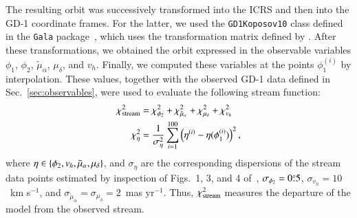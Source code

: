 \documentclass[referee]{aa} %
\begin{document}
The resulting orbit was successively transformed into the ICRS and then into the GD-1 coordinate frames. For the latter, we used the \texttt{GD1Koposov10} class defined in the \texttt{Gala} package~\citep{gala,adrian_price_whelan_2020_4159870}, which uses the transformation matrix defined by \citet{Koposov_2010}.
After these transformations, we obtained the orbit expressed in the observable variables $\phi_1$, $\phi_2$, $\tilde{\mu}_\alpha$, $\mu_\delta$, and $v_h$. Finally, we computed these variables at the points $\phi_1^{(i)}$ by interpolation. These values, together with the observed GD-1 data defined in Sec.~\ref{sec:observables}, were used to evaluate the following stream function:
\begin{align}
   \label{chi2:stream}
   \chi^2_{\rm{stream}} &= \chi^2_{\phi_2} + \chi^2_{\tilde{\mu}_\alpha}+ \chi^2_{\mu_\delta}+\chi^2_{v_h}\\
   \label{chi2:component}
   \chi^2_{\eta} &= \frac{1}{\sigma_\eta^2}\sum_{i=1}^{100} \left(\eta^{(i)}-\eta(\phi_1^{(i)})\right)^2,
\end{align}
where
$\eta\in\left\{\phi_2, v_h, \tilde{\mu}_\alpha, \mu_\delta\right\}$, and $\sigma_\eta$ are the corresponding dispersions of the stream data points estimated by inspection of Figs.~1, 3, and 4 of~\citet{Ibata_2020},
$\sigma_{\phi_2}=0\overset{\circ}{.} 5$,
$\sigma_{v_h} = 10$~km s$^{-1}$, and
$\sigma_{\tilde{\mu}_\alpha}= \sigma_{\mu_\delta}= 2$~mas yr$^{-1}$.
Thus, $\chi^2_{\rm{stream}}$ measures the departure of the model from the observed stream.
\end{document}
